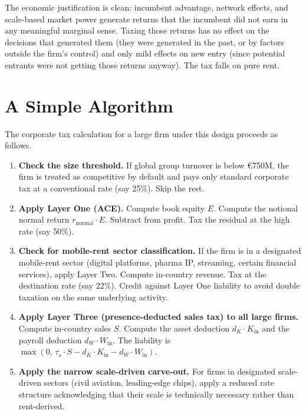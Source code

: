 \documentclass[11pt,a4paper]{article}
\begin{document}
The economic justification is clean: incumbent advantage, network effects, and scale-based market power generate returns that the incumbent did not earn in any meaningful marginal sense. Taxing those returns has no effect on the decisions that generated them (they were generated in the past, or by factors outside the firm's control) and only mild effects on new entry (since potential entrants were not getting those returns anyway). The tax falls on pure rent.

\section{A Simple Algorithm}

The corporate tax calculation for a large firm under this design proceeds as follows.

\begin{enumerate}
\item \textbf{Check the size threshold.} If global group turnover is below €750M, the firm is treated as competitive by default and pays only standard corporate tax at a conventional rate (say 25\%). Skip the rest.

\item \textbf{Apply Layer One (ACE).} Compute book equity $E$. Compute the notional normal return $r_{\text{normal}} \cdot E$. Subtract from profit. Tax the residual at the high rate (say 50\%).

\item \textbf{Check for mobile-rent sector classification.} If the firm is in a designated mobile-rent sector (digital platforms, pharma IP, streaming, certain financial services), apply Layer Two. Compute in-country revenue. Tax at the destination rate (say 22\%). Credit against Layer One liability to avoid double taxation on the same underlying activity.

\item \textbf{Apply Layer Three (presence-deducted sales tax) to all large firms.} Compute in-country sales $S$. Compute the asset deduction $d_K \cdot K_{\text{in}}$ and the payroll deduction $d_W \cdot W_{\text{in}}$. The liability is $\max(0, \, \tau_s \cdot S - d_K \cdot K_{\text{in}} - d_W \cdot W_{\text{in}})$.

\item \textbf{Apply the narrow scale-driven carve-out.} For firms in designated scale-driven sectors (civil aviation, leading-edge chips), apply a reduced rate structure acknowledging that their scale is technically necessary rather than rent-derived.
\end{enumerate}
\end{document}
